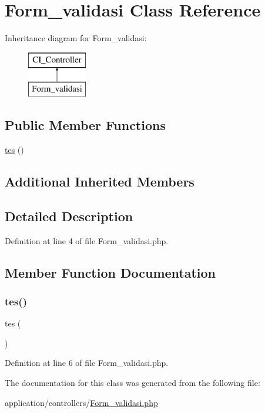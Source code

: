 \hypertarget{class_form__validasi}{}\section{Form\+\_\+validasi Class Reference}
\label{class_form__validasi}
Inheritance diagram for Form\+\_\+validasi\+:\begin{figure}[H]
\begin{center}
\leavevmode
\includegraphics[height=2.000000cm]{class_form__validasi}
\end{center}
\end{figure}
\subsection*{Public Member Functions}
\begin{DoxyCompactItemize}
\item 
\mbox{\hyperlink{class_form__validasi_a7f3c2d562afcfc1c3e52bda7637191cf}{tes}} ()
\end{DoxyCompactItemize}
\subsection*{Additional Inherited Members}


\subsection{Detailed Description}


Definition at line 4 of file Form\+\_\+validasi.\+php.



\subsection{Member Function Documentation}
\mbox{\label{class_form__validasi_a7f3c2d562afcfc1c3e52bda7637191cf}} 
\subsubsection{\texorpdfstring{tes()}{tes()}}
{\footnotesize\ttfamily tes (\begin{DoxyParamCaption}{ }\end{DoxyParamCaption})}



Definition at line 6 of file Form\+\_\+validasi.\+php.



The documentation for this class was generated from the following file\+:\begin{DoxyCompactItemize}
\item 
application/controllers/\mbox{\hyperlink{_form__validasi_8php}{Form\+\_\+validasi.\+php}}\end{DoxyCompactItemize}
